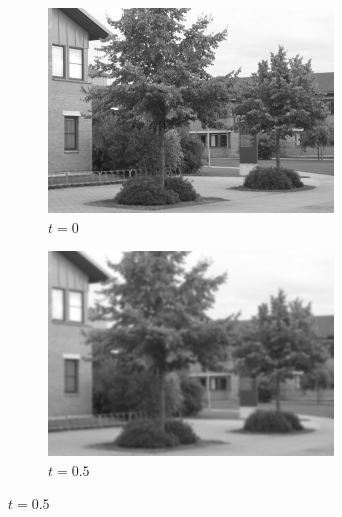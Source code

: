 \documentclass[a4paper,12pt]{article}
\begin{document}
\begin{figure}[H]
    \centering

    \begin{subfigure}[b]{0.4\linewidth}
    \includegraphics[width=\linewidth]{Scalespace0.png}
    \caption{$t=0$}
    \end{subfigure}
    \begin{subfigure}[b]{0.4\linewidth}
    \includegraphics[width=\linewidth]{Scalespace1.png}
    \caption{$t=0.5$}
    \end{subfigure}


\end{figure}
\end{document}
